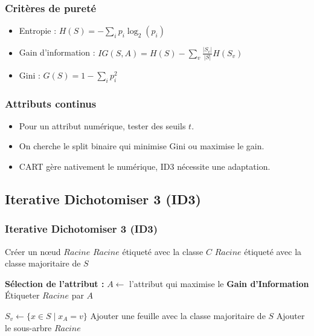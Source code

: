 \documentclass{beamer}
\begin{document}
\begin{frame}
	\frametitle{Critères de pureté}
	\begin{itemize}
		\item Entropie : $H(S) = -\sum_i p_i \log_2(p_i)$
		\item Gain d'information : $IG(S, A) = H(S) - \sum_v \frac{|S_v|}{|S|} H(S_v)$
		\item Gini : $G(S) = 1 - \sum_i p_i^2$
	\end{itemize}
\end{frame}

\begin{frame}
	\frametitle{Attributs continus}
	\begin{itemize}
		\item Pour un attribut numérique, tester des seuils $t$.
		\item On cherche le split binaire qui minimise Gini ou maximise le gain.
		\item CART gère nativement le numérique, ID3 nécessite une adaptation.
	\end{itemize}
\end{frame}

\subsection{Iterative Dichotomiser 3 (ID3)}
\begin{frame}
	\frametitle{Iterative Dichotomiser 3 (ID3)}
	\begin{algorithm}[H]
	\scriptsize
    \caption{Algorithme ID3}
    \begin{algorithmic}[1]
            \State Créer un nœud $Racine$
                \State \Return $Racine$ étiqueté avec la classe $C$
            \EndIf
                \State \Return $Racine$ étiqueté avec la classe majoritaire de $S$
            \EndIf

            \State \textbf{Sélection de l'attribut :}
            \State $A \gets$ l'attribut qui maximise le \textbf{Gain d'Information}
            \State Étiqueter $Racine$ par $A$

                \State $S_v \gets \{x \in S \mid x_A = v\}$
                    \State Ajouter une feuille avec la classe majoritaire de $S$
                \Else
                    \State Ajouter le sous-arbre 
                \EndIf
            \EndFor
            \State \Return $Racine$
        \EndProcedure
    \end{algorithmic}
    \end{algorithm}
\end{frame}
\end{document}
